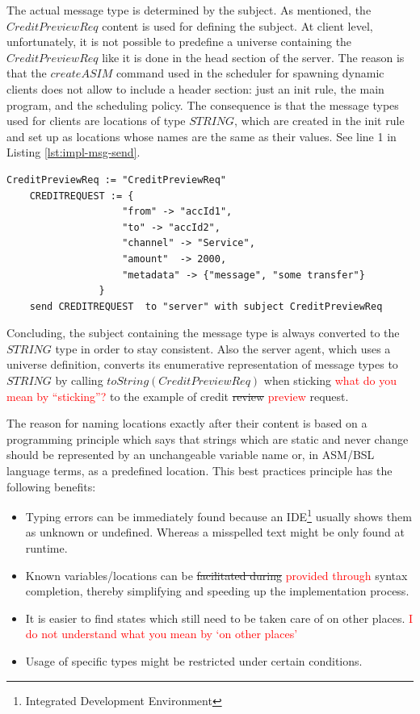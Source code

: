 The actual message type is determined by the subject. As mentioned, the $CreditPreviewReq$ content is used for defining the subject. At client level, unfortunately, it is not possible to predefine a universe containing the $CreditPreviewReq$ like it is done in the head section of the server. The reason is that the $createASIM$ command used in the scheduler for spawning dynamic clients does not allow to include a header section: just an init rule, the main program, and the scheduling policy. The consequence is that the message types used for clients are locations of type $STRING$, which are created in the init rule and set up as locations whose names are the same as their values. See line 1 in Listing \ref{lst:impl-msg-send}.

\begin{center}
\begin{minipage}{0.8\textwidth}
\small
\begin{lstlisting}[language=bsl_lst,caption={\bf\small send message},label={lst:impl-msg-send} ]
	CreditPreviewReq := "CreditPreviewReq"
	CREDITREQUEST := {
					"from" -> "accId1",
					"to" -> "accId2",
					"channel" -> "Service",
					"amount"  -> 2000,
					"metadata" -> {"message", "some transfer"}
				}
	send CREDITREQUEST  to "server" with subject CreditPreviewReq
\end{lstlisting}
\end{minipage}
\end{center}

Concluding, the subject containing the message type is always converted to the $STRING$ type in order to stay consistent. Also the server agent, which uses a universe definition, converts its enumerative representation of message types to $STRING$ by calling $toString(CreditPreviewReq)$ when sticking \textcolor{red}{what do you mean by ``sticking''?} to the example of credit \st{review} \textcolor{red}{preview} request.

The reason for naming locations exactly after their content is based on a programming principle which says that strings which are static and never change should be represented by an unchangeable variable name or, in ASM/BSL language terms, as a predefined location. This best practices principle has the following benefits:

\begin{itemize}
	\item Typing errors can be immediately found because an IDE\footnote{Integrated Development Environment} usually shows them as unknown or undefined. Whereas a misspelled text might be only found at runtime.
	\item Known variables/locations can be \st{facilitated during} \textcolor{red}{provided through} syntax completion, thereby simplifying and speeding up the implementation process.
	\item It is easier to find states which still need to be taken care of on other places. \textcolor{red}{I do not understand what you mean by `on other places'}
	\item Usage of specific types might be restricted under certain conditions.
\end{itemize}


